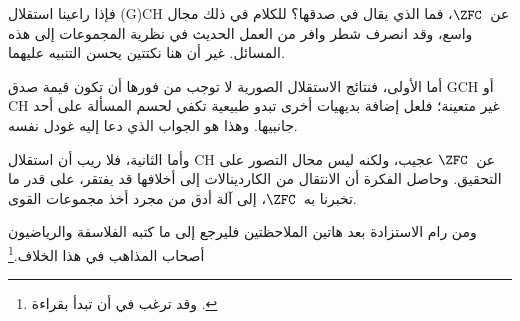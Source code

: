 \documentclass[../../../include/open-logic-section]{subfiles}
\begin{document}
فإذا راعينا استقلال (G)CH عن~$\ZFC$، فما الذي يقال في صدقها؟ للكلام
في ذلك مجال واسع، وقد انصرف شطر وافر من العمل الحديث في نظرية
المجموعات إلى هذه المسائل. غير أن هنا نكتتين يحسن التنبيه عليهما.

أما الأولى، فنتائج الاستقلال الصورية لا توجب من فورها أن تكون قيمة صدق
GCH أو CH غير متعينة؛ فلعل إضافة بديهيات أخرى تبدو طبيعية تكفي لحسم
المسألة على أحد جانبيها. وهذا هو الجواب الذي دعا إليه غودل نفسه.

وأما الثانية، فلا ريب أن استقلال CH عن~$\ZFC$ عجيب، ولكنه ليس محال
التصور على التحقيق. وحاصل الفكرة أن الانتقال من الكاردينالات إلى
أخلافها قد يفتقر، على قدر ما تخبرنا به~$\ZFC$، إلى آلة أدق من مجرد أخذ
مجموعات القوى.

ومن رام الاستزادة بعد هاتين الملاحظتين فليرجع إلى ما كتبه الفلاسفة
والرياضيون أصحاب المذاهب في هذا الخلاف.\footnote{وقد ترغب في
أن تبدأ بقراءة \citet[\S15.6]{Potter2004}.}
\end{document}
